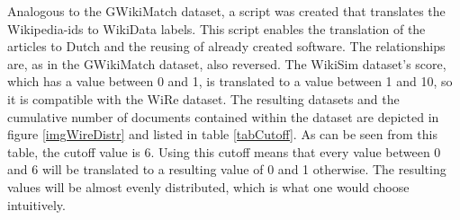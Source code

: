 Analogous to the GWikiMatch dataset, a script was created that translates the Wikipedia-ids to WikiData labels. This script enables the translation of the articles to Dutch and the reusing of already created software. The relationships are, as in the GWikiMatch dataset, also reversed. The WikiSim dataset's score, which has a value between 0 and 1, is translated to a value between 1 and 10, so it is compatible with the WiRe dataset. The resulting datasets and the cumulative number of documents contained within the dataset are depicted in figure \ref{imgWireDistr} and listed in table \ref{tabCutoff}. As can be seen from this table, the cutoff value is 6. Using this cutoff means that every value between 0 and 6 will be translated to a resulting value of 0 and 1 otherwise. The resulting values will be almost evenly distributed, which is what one would choose intuitively.


\pagebreak


